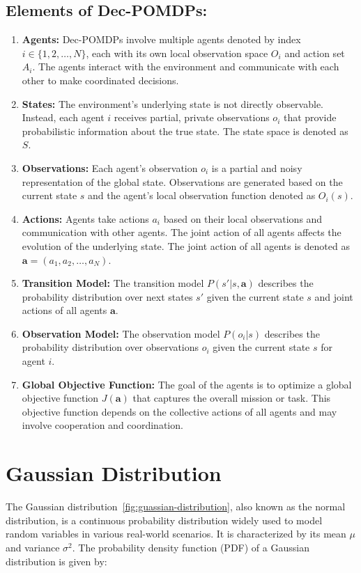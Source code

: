 \subsection{Elements of Dec-POMDPs:}\label{subsec:elements-of-dec-pomdps:}
\begin{enumerate}
    \item \textbf{Agents:} Dec-POMDPs involve multiple agents denoted by index $i \in \{1, 2, \ldots, N\}$, each with its own local observation space $O_i$ and action set $A_i$. The agents interact with the environment and communicate with each other to make coordinated decisions.
    \item \textbf{States:} The environment's underlying state is not directly observable. Instead, each agent $i$ receives partial, private observations $o_i$ that provide probabilistic information about the true state. The state space is denoted as $S$.
    \item \textbf{Observations:} Each agent's observation $o_i$ is a partial and noisy representation of the global state. Observations are generated based on the current state $s$ and the agent's local observation function denoted as $O_i(s)$.
    \item \textbf{Actions:} Agents take actions $a_i$ based on their local observations and communication with other agents. The joint action of all agents affects the evolution of the underlying state. The joint action of all agents is denoted as $\mathbf{a} = (a_1, a_2, \ldots, a_N)$.
    \item \textbf{Transition Model:} The transition model $P(s' | s, \mathbf{a})$ describes the probability distribution over next states $s'$ given the current state $s$ and joint actions of all agents $\mathbf{a}$.
    \item \textbf{Observation Model:} The observation model $P(o_i | s)$ describes the probability distribution over observations $o_i$ given the current state $s$ for agent $i$.
    \item \textbf{Global Objective Function:} The goal of the agents is to optimize a global objective function $J(\mathbf{a})$ that captures the overall mission or task. This objective function depends on the collective actions of all agents and may involve cooperation and coordination.

\end{enumerate}

\section{Gaussian Distribution}\label{sec:gaussian-distribution}
The Gaussian distribution~\cref{fig:guassian-distribution}, also known as the normal distribution, is a continuous probability distribution widely used to model random variables in various real-world scenarios. It is characterized by its mean $\mu$ and variance $\sigma^2$. The probability density function (PDF) of a Gaussian distribution is given by:

